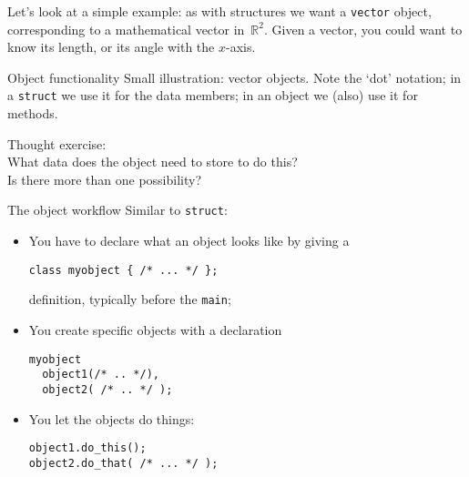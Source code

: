 Let's look at a simple example: as with structures we want a
\lstinline{vector} object, corresponding to a mathematical vector
in~$\mathbb{R}^2$. Given a vector, you could want to know its length, or its
angle with the $x$-axis.

\begin{block}{Object functionality}
  \label{sl:object-functionality}
  Small illustration: vector objects.
  Note the `dot' notation; in a \lstinline{struct} we use it for the
  data members; in an object we (also) use it for methods.
\end{block}

\begin{exercise}
  \label{ex:pointdesign}
  Thought exercise:\\
  What data does the object need to store to do this?\\
  Is there more than one possibility?
\end{exercise}

\begin{block}{The object workflow}
  \label{sl:object-flow}
  Similar to \lstinline{struct}:
  \begin{itemize}
  \item You have to declare what an object looks like by giving a
\begin{lstlisting}
class myobject { /* ... */ };
\end{lstlisting}
    definition, typically before the
    \lstinline{main};
  \item You create specific objects with a declaration
\begin{lstlisting}
myobject
  object1(/* .. */),
  object2( /* .. */ );    
\end{lstlisting}
  \item You let the objects do things:
\begin{lstlisting}
object1.do_this();
object2.do_that( /* ... */ );
\end{lstlisting}
  \end{itemize}
\end{block}

